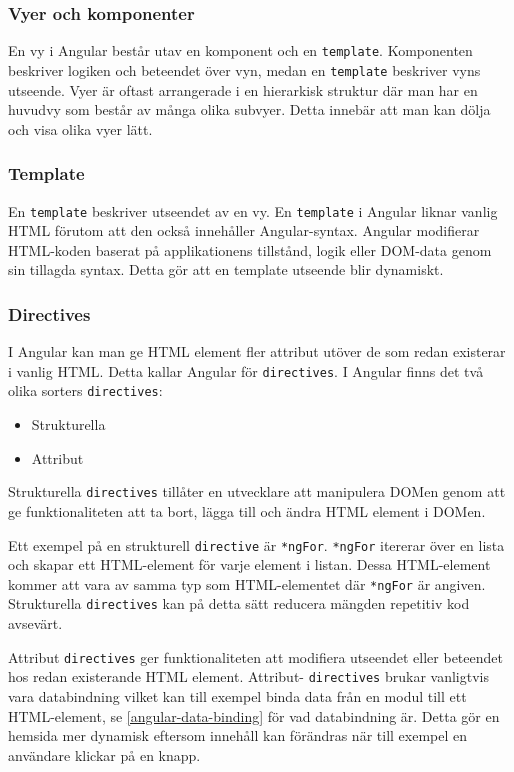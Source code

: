 
\subsubsection{Vyer och komponenter}
En vy i Angular består utav en komponent och en \texttt{template}. Komponenten beskriver logiken och beteendet över vyn, medan en \texttt{template} beskriver vyns utseende. Vyer är oftast arrangerade i en hierarkisk struktur där man har en huvudvy som består av många olika subvyer. Detta innebär att man kan dölja och visa olika vyer lätt. 

\subsubsection{Template}
\label{angular-template}
En \texttt{template} beskriver utseendet av en vy. En \texttt{template} i Angular liknar vanlig HTML förutom att den också innehåller Angular-syntax. Angular modifierar HTML-koden baserat på applikationens tillstånd, logik eller DOM-data genom sin tillagda syntax.\cite{angular-components} Detta gör att en template utseende blir dynamiskt.

\subsubsection{Directives}
I Angular kan man ge HTML element fler attribut utöver de som redan existerar i vanlig HTML. Detta kallar Angular för \texttt{directives}. I Angular finns det två olika sorters \texttt{directives}:
\begin{itemize}
    \item Strukturella
    \item Attribut
\end{itemize}
Strukturella \texttt{directives} tillåter en utvecklare att manipulera DOMen genom att ge funktionaliteten att ta bort, lägga till och ändra HTML element i DOMen. \cite{angular-services} 

Ett exempel på en strukturell \texttt{directive} är \texttt{*ngFor}. \texttt{*ngFor} itererar över en lista och skapar ett HTML-element för varje element i listan. Dessa HTML-element kommer att vara av samma typ som HTML-elementet där \texttt{*ngFor} är angiven. Strukturella \texttt{directives} kan på detta sätt reducera mängden repetitiv kod avsevärt.

Attribut \texttt{directives} ger funktionaliteten att modifiera utseendet eller beteendet hos redan existerande HTML element. Attribut- \texttt{directives} brukar vanligtvis vara databindning vilket kan till exempel binda data från en modul till ett HTML-element, se \ref{angular-data-binding} för vad databindning är. Detta gör en hemsida mer dynamisk eftersom innehåll kan förändras när till exempel en användare klickar på en knapp.

